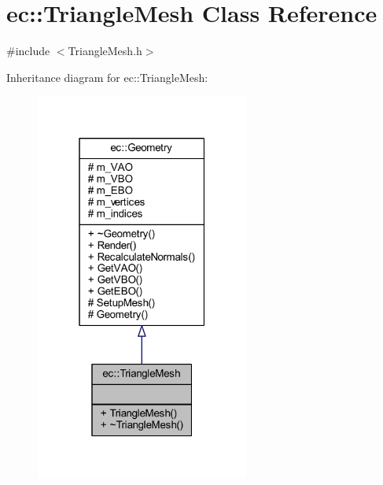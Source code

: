 \hypertarget{classec_1_1_triangle_mesh}{}\section{ec\+:\+:Triangle\+Mesh Class Reference}
\label{classec_1_1_triangle_mesh}


{\ttfamily \#include $<$Triangle\+Mesh.\+h$>$}



Inheritance diagram for ec\+:\+:Triangle\+Mesh\+:
\nopagebreak
\begin{figure}[H]
\begin{center}
\leavevmode
\includegraphics[width=199pt]{classec_1_1_triangle_mesh__inherit__graph}
\end{center}
\end{figure}


